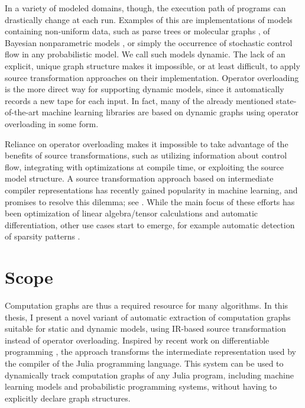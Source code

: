 In a variety of modeled domains, though, the execution path of programs can drastically change at
each run.  Examples of this are implementations of models containing non-uniform data, such as parse
trees \parencite{socher2011parsing} or molecular graphs \parencite{bianucci2000application}, of
Bayesian nonparametric models \parencite{hjort2010bayesian}, or simply the occurrence of stochastic
control flow in any probabilistic model.  We call such models dynamic.  The lack of an explicit,
unique graph structure makes it impossible, or at least difficult, to apply source transformation
approaches on their implementation.  Operator overloading is the more direct way for supporting
dynamic models, since it automatically records a new tape for each input. In fact, many of the
already mentioned state-of-the-art machine learning libraries are based on dynamic graphs using
operator overloading in some form.

Reliance on operator overloading makes it impossible to take advantage of the benefits of source
transformations, such as utilizing information about control flow, integrating with optimizations at
compile time, or exploiting the source model structure.  A source transformation approach based on
intermediate compiler representations has recently gained popularity in machine learning, and
promises to resolve this dilemma; see \textcite{bradbury2018jax,lattner2020mlir}.  While the main
focus of these efforts has been optimization of linear algebra/tensor calculations and automatic
differentiation, other use cases start to emerge, for example automatic detection of sparsity
patterns \parencite{gowda2019sparsity}.

\section{Scope}
\label{sec:scope}
\setlength{\parskip}{0pt}

Computation graphs are thus a required resource for many algorithms.  In this thesis, I present a
novel variant of automatic extraction of computation graphs suitable for static and dynamic models,
using IR-based source transformation instead of operator overloading.  Inspired by recent work on
differentiable programming \parencite{innes2018don}, the approach transforms the intermediate
representation used by the compiler of the Julia programming language.  This system can be used to
dynamically track computation graphs of any Julia program, including machine learning models and
probabilistic programming systems, without having to explicitly declare graph structures.

